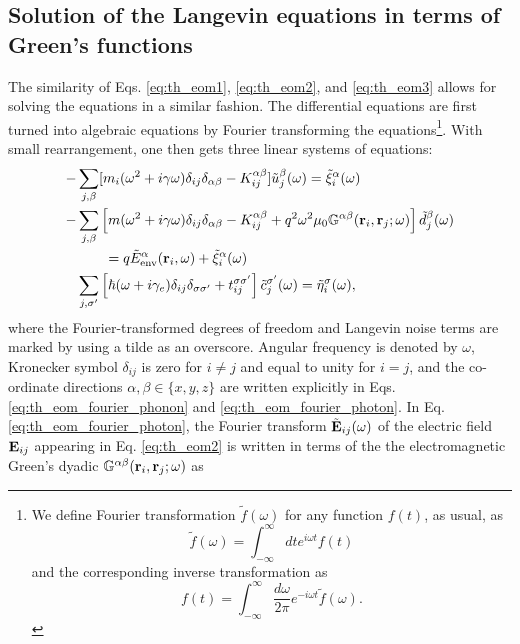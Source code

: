 \subsection{Solution of the Langevin equations in terms of Green's functions}
\label{sec:th_eom_solution}
The similarity of Eqs. \eqref{eq:th_eom1}, \eqref{eq:th_eom2}, and \eqref{eq:th_eom3} allows for solving the equations in a similar fashion. The differential equations are first turned into algebraic equations by Fourier transforming the equations\footnote{We define Fourier transformation $\tilde f(\omega)$ for any function $f(t)$, as usual, as
\begin{equation}
 \tilde f(\omega) = \int_{-\infty}^{\infty} dt e^{i\omega t} f(t) \label{eq:th_fourier}
\end{equation}
and the corresponding inverse transformation as
\begin{equation}
 f(t) = \int_{-\infty}^{\infty} \frac{d\omega}{2\pi} e^{-i\omega t}\tilde f(\omega). \label{eq:th_fourier_inv}
\end{equation}}.
With small rearrangement, one then gets three linear systems of equations:
\begin{subequations}
\begin{align}
   - & \sum_{j,\beta}  [m_i (\omega^2+i\gamma \omega) \delta_{ij}\delta_{\alpha\beta} - K_{ij}^{\alpha\beta}] \tilde{u}_j^{\beta}(\omega) = \tilde \xi_i^{\alpha}(\omega) \label{eq:th_eom_fourier_phonon} \\
  - &  \sum_{j,\beta} \left[m(\omega^2+i\gamma\omega) \delta_{ij}\delta_{\alpha\beta} - K_{ij}^{\alpha\beta} +q^2 \omega^2 \mu_0 \mathbb{G}^{\alpha\beta}(\mathbf{r}_i,\mathbf{r}_j;\omega) \right]\tilde{d}_j^{\beta}(\omega) \notag \\
  & \qquad = q\tilde{E}_{\textrm{env}}^{\alpha}(\mathbf{r}_i,\omega) + \tilde{\xi}^{\alpha}_i(\omega) \label{eq:th_eom_fourier_photon} \\ 
  &  \sum_{j,\sigma'} \left[\hbar (\omega+i\gamma_e) \delta_{ij}\delta_{\sigma\sigma'} + t_{ij}^{\sigma\sigma'} \right] \tilde c_j^{\sigma'}(\omega) = \tilde \eta_i^{\sigma}(\omega)  ,  \label{eq:th_eom_fourier_electron}
\end{align}
\end{subequations}
where the Fourier-transformed degrees of freedom and Langevin noise terms are marked by using a tilde as an overscore. Angular frequency is denoted by $\omega$, Kronecker symbol $\delta_{ij}$ is zero for $i\neq j$ and equal to unity for $i=j$, and the co-ordinate directions $\alpha,\beta \in \{x,y,z\}$ are written explicitly in Eqs. \eqref{eq:th_eom_fourier_phonon} and \eqref{eq:th_eom_fourier_photon}. In Eq. \eqref{eq:th_eom_fourier_photon}, the Fourier transform $\tilde{\mathbf{E}}_{ij}(\omega)$ of the electric field $\mathbf{E}_{ij}$ appearing in Eq. \eqref{eq:th_eom2} is written in terms of the the electromagnetic Green's dyadic $\mathbb{G}^{\alpha\beta}(\mathbf{r}_i,\mathbf{r}_j;\omega)$ as \cite{novotny}
